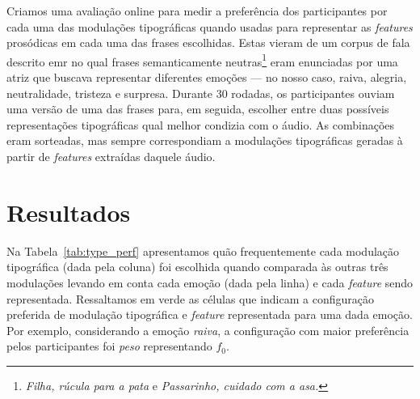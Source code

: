 \documentclass[11pt]{article}
\begin{document}
 Criamos uma avaliação online para medir a preferência dos participantes por cada uma das modulações tipográficas quando usadas para representar as {\itshape features} prosódicas em cada uma das frases escolhidas. Estas vieram de um corpus de fala descrito emr \cite{pdpcosta2015} no qual frases semanticamente neutras\footnote{{\itshape Filha, rúcula para a pata} e {\itshape Passarinho, cuidado com a asa.}} eram enunciadas por uma atriz que buscava representar diferentes emoções --- no nosso caso, raiva, alegria, neutralidade, tristeza e surpresa. Durante 30 rodadas, os participantes ouviam uma versão de uma das frases para, em seguida, escolher entre duas possíveis representações tipográficas qual melhor condizia com o áudio. As combinações eram sorteadas, mas sempre correspondiam a modulações tipográficas geradas à partir de {\itshape features} extraídas daquele áudio.
  


\section{Resultados}
  \label{sec:resultados}
  
  Na Tabela~\ref{tab:type_perf} apresentamos quão frequentemente cada modulação tipográfica (dada pela coluna) foi escolhida quando comparada às outras três modulações levando em conta cada emoção (dada pela linha) e cada {\itshape feature} sendo representada. Ressaltamos em verde as células que indicam a configuração preferida de modulação tipográfica e {\itshape feature} representada para uma dada emoção. Por exemplo, considerando a emoção {\itshape raiva}, a configuração com maior preferência pelos participantes foi {\itshape peso} representando $f_0$.
  
\end{document}
